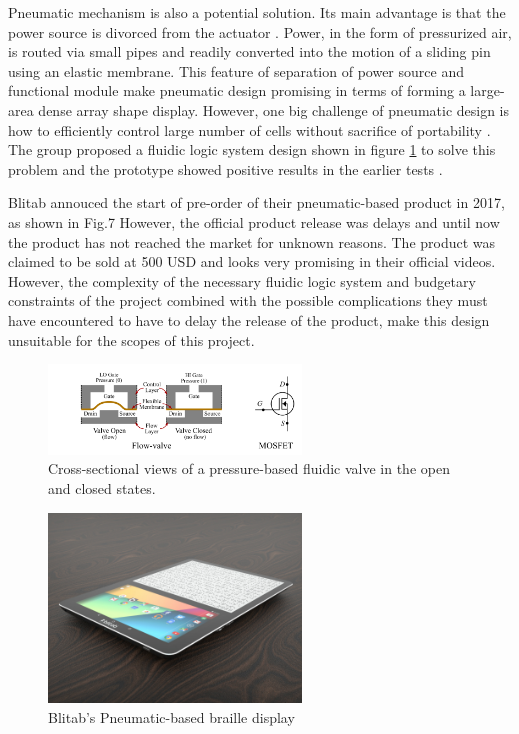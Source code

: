 Pneumatic mechanism is also a potential solution.
Its main advantage is that the power source is divorced from the actuator \cite{russomanno_design_2015}.
Power, in the form of pressurized air, is routed via small pipes and readily converted into the motion of a sliding pin using an elastic membrane.
This feature of separation of power source and functional module make pneumatic design promising in terms of forming a large-area dense array shape display.
However, one big challenge of pneumatic design is how to efficiently control large number of cells without sacrifice of portability \cite{russomanno_model-based_2017}.
The group proposed a fluidic logic system design shown in figure \ref{fig:pneumatic-schema} to solve this problem and the prototype showed positive results in the earlier tests \cite{russomanno_design_2015}.

Blitab annouced the start of pre-order of their pneumatic-based product in 2017, as shown in Fig.7 However, the official product release was delays and until now the product has not reached the market for unknown reasons. The product was claimed to be sold at 500 USD and looks very promising in their official videos. However, the complexity of the necessary fluidic logic system and budgetary constraints of the project combined with the possible complications they must have encountered to have to delay the release of the product, make this design unsuitable for the scopes of this project.

\begin{figure}\centering
    \includegraphics[width=0.6\textwidth]{figures/pneumatic-schema.png}
\caption{Cross-sectional views of a pressure-based fluidic valve in the open and closed states.}
\label{fig:pneumatic-schema}
\end{figure}

\begin{figure}\centering
    \includegraphics[width=0.6\textwidth]{figures/Blitab_product.jpg}
\caption{Blitab's Pneumatic-based braille display}
\label{fig:Blitab-product}
\end{figure}